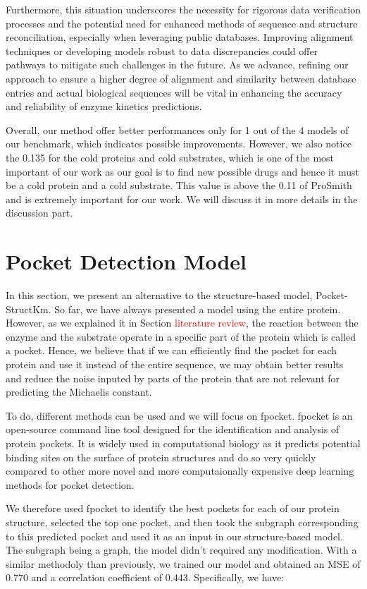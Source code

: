 Furthermore, this situation underscores the necessity for rigorous data verification processes and the potential need for enhanced methods of sequence and structure reconciliation, especially when leveraging public databases. Improving alignment techniques or developing models robust to data discrepancies could offer pathways to mitigate such challenges in the future. As we advance, refining our approach to ensure a higher degree of alignment and similarity between database entries and actual biological sequences will be vital in enhancing the accuracy and reliability of enzyme kinetics predictions.

Overall, our method offer better performances only for 1 out of the 4 models of our benchmark, which indicates possible improvements. However, we also notice the 0.135 for the cold proteins and cold substrates, which is one of the most important of our work as our goal is to find new possible drugs and hence it must be a cold protein and a cold substrate. This value is above the 0.11 of ProSmith and is extremely important for our work. We will discuss it in more details in the discussion part.

\section{Pocket Detection Model}

In this section, we present an alternative to the structure-based model, Pocket-StructKm. So far, we have always presented a model using the entire protein. However, as we explained it in Section \textcolor{red}{literature review}, the reaction between the enzyme and the substrate operate in a specific part of the protein which is called a pocket. Hence, we believe that if we can efficiently find the pocket for each protein and use it instead of the entire sequence, we may obtain better results and reduce the noise inputed by parts of the protein that  are not relevant for predicting the Michaelis constant. 

To do, different methods can be used and we will focus on fpocket. fpocket is an open-source command line tool designed for the identification and analysis of protein pockets. It is widely used in computational biology as it predicts potential binding sites on the surface of protein structures and do so very quickly compared to other more novel and more computaionally expensive deep learning methods for pocket detection.

We therefore used fpocket to identify the best pockets for each of our protein structure, selected the top one pocket, and then took the subgraph corresponding to this predicted pocket and used it as an input in our structure-based model. The subgraph  being a graph, the model didn't required any modification. With a similar methodoly than previously, we trained our model and obtained an MSE of 0.770 and a correlation coefficient of 0.443. Specifically, we have:

